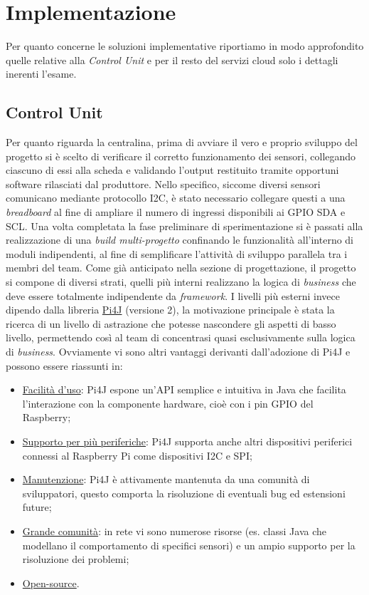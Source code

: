 
\section{Implementazione}\label{sec:implementazione}
Per quanto concerne le soluzioni implementative riportiamo in modo approfondito quelle relative alla \textit{Control Unit} e per il resto del servizi cloud solo i dettagli inerenti l'esame.

\subsection{Control Unit}
Per quanto riguarda la centralina, prima di avviare il vero e proprio sviluppo del progetto si è scelto di verificare il corretto funzionamento dei sensori, collegando ciascuno di essi alla scheda e validando l'output restituito tramite opportuni software rilasciati dal produttore. Nello specifico, siccome diversi sensori comunicano mediante protocollo I2C, è stato necessario collegare questi a una \textit{breadboard} al fine di ampliare il numero di ingressi disponibili ai GPIO SDA e SCL. Una volta completata la fase preliminare di sperimentazione si è passati alla realizzazione di una \textit{build multi-progetto} confinando le funzionalità all'interno di moduli indipendenti, al fine di semplificare l'attività di sviluppo parallela tra i membri del team. Come già anticipato nella sezione di progettazione, il progetto si compone di diversi strati, quelli più interni realizzano la logica di \textit{business} che deve essere totalmente indipendente da \textit{framework}. I livelli più esterni invece dipendo dalla libreria \href{https://pi4j.com/}{Pi4J} (versione 2), la motivazione principale è stata la ricerca di un livello di astrazione che potesse nascondere gli aspetti di basso livello, permettendo così al team di concentrasi quasi esclusivamente sulla logica di \textit{business}. Ovviamente vi sono altri vantaggi derivanti dall'adozione di Pi4J e possono essere riassunti in:
\begin{itemize}
    \item \underline{Facilità d'uso}: Pi4J espone un'API semplice e intuitiva in Java che facilita l'interazione con la componente hardware, cioè con i pin GPIO del Raspberry;
    \item \underline{Supporto per più periferiche}: Pi4J supporta anche altri dispositivi periferici connessi al Raspberry Pi come dispositivi I2C e SPI;
    \item \underline{Manutenzione}: Pi4J è attivamente mantenuta da una comunità di sviluppatori, questo comporta la risoluzione di eventuali bug ed estensioni future;
    \item \underline{Grande comunità}: in rete vi sono numerose risorse (es. classi Java che modellano il comportamento di specifici sensori) e un ampio supporto per la risoluzione dei problemi;
    \item \underline{Open-source}.
\end{itemize}
